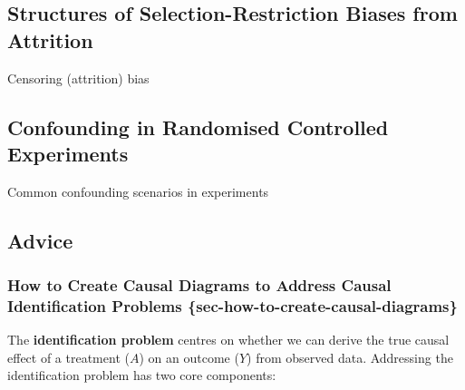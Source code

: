 \documentclass[
  single column]{article}
\begin{document}
\newpage{}

\subsection{Structures of Selection-Restriction Biases from
Attrition}\label{structures-of-selection-restriction-biases-from-attrition}

\begin{table}

\caption{\label{tbl-censoring-bias}Censoring (attrition) bias}

\centering{

\terminologycensoring

}

\end{table}%

\newpage{}

\subsection{Confounding in Randomised Controlled
Experiments}\label{section-confounding-experiments}

\begin{table}

\caption{\label{tbl-experiments}Common confounding scenarios in
experiments}

\centering{

\terminologyelconfoundersexperiments

}

\end{table}%

\newpage{}

\subsection{Advice}\label{advice}

\subsubsection{How to Create Causal Diagrams to Address Causal
Identification Problems
\{sec-how-to-create-causal-diagrams\}}\label{how-to-create-causal-diagrams-to-address-causal-identification-problems-sec-how-to-create-causal-diagrams}

The \textbf{identification problem} centres on whether we can derive the
true causal effect of a treatment (\(A\)) on an outcome (\(Y\)) from
observed data. Addressing the identification problem has two core
components:
\end{document}
